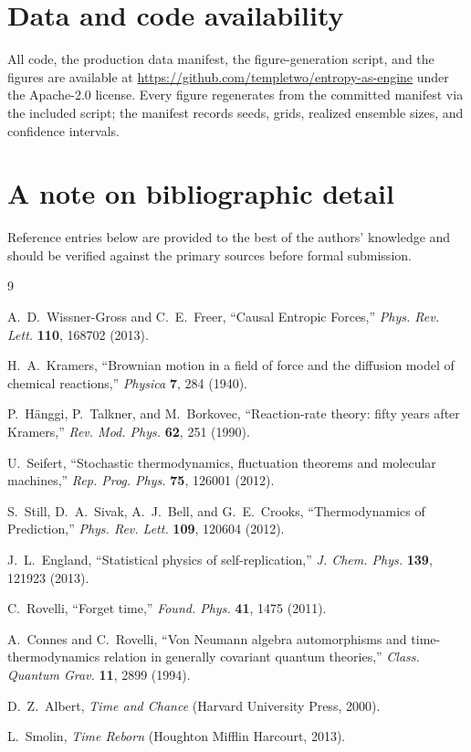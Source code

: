 \documentclass[11pt]{article}
\begin{document}
\section*{Data and code availability}
All code, the production data manifest, the figure-generation script, and the figures are available at \url{https://github.com/templetwo/entropy-as-engine} under the Apache-2.0 license. Every figure regenerates from the committed manifest via the included script; the manifest records seeds, grids, realized ensemble sizes, and confidence intervals.

\section*{A note on bibliographic detail}
Reference entries below are provided to the best of the authors' knowledge and should be verified against the primary sources before formal submission.

\begin{thebibliography}{9}

 A.~D.~Wissner-Gross and C.~E.~Freer, ``Causal Entropic Forces,'' \emph{Phys. Rev. Lett.} \textbf{110}, 168702 (2013).

 H.~A.~Kramers, ``Brownian motion in a field of force and the diffusion model of chemical reactions,'' \emph{Physica} \textbf{7}, 284 (1940).

 P.~H\"anggi, P.~Talkner, and M.~Borkovec, ``Reaction-rate theory: fifty years after Kramers,'' \emph{Rev. Mod. Phys.} \textbf{62}, 251 (1990).

 U.~Seifert, ``Stochastic thermodynamics, fluctuation theorems and molecular machines,'' \emph{Rep. Prog. Phys.} \textbf{75}, 126001 (2012).

 S.~Still, D.~A.~Sivak, A.~J.~Bell, and G.~E.~Crooks, ``Thermodynamics of Prediction,'' \emph{Phys. Rev. Lett.} \textbf{109}, 120604 (2012).

 J.~L.~England, ``Statistical physics of self-replication,'' \emph{J. Chem. Phys.} \textbf{139}, 121923 (2013).

 C.~Rovelli, ``Forget time,'' \emph{Found. Phys.} \textbf{41}, 1475 (2011).

 A.~Connes and C.~Rovelli, ``Von Neumann algebra automorphisms and time-thermodynamics relation in generally covariant quantum theories,'' \emph{Class. Quantum Grav.} \textbf{11}, 2899 (1994).

 D.~Z.~Albert, \emph{Time and Chance} (Harvard University Press, 2000).

 L.~Smolin, \emph{Time Reborn} (Houghton Mifflin Harcourt, 2013).

\end{thebibliography}
\end{document}
